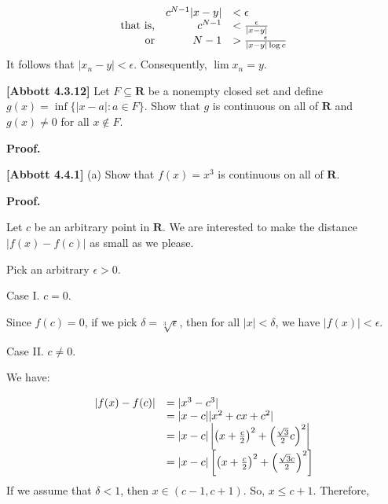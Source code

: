 \documentclass[10pt]{article}
\begin{document}
\begin{equation*}
\begin{array}{ r r l }
 & c^{N-1} |x-y| & < \epsilon \\
\text{that is,} & c^{N-1} & < \frac{\epsilon }{|x-y|}\\
\text{or} & N-1 &  >\frac{\epsilon }{|x-y|\log c}
\end{array}
\end{equation*}
It follows that $\displaystyle |x_{n} -y|< \epsilon $. Consequently, $\displaystyle \lim x_{n} =y$.



\textbf{[Abbott 4.3.12]} Let $\displaystyle F\subseteq \mathbf{R}$ be a nonempty closed set and define $\displaystyle g( x) =\inf\{|x-a|:a\in F\}$. Show that $\displaystyle g$ is continuous on all of $\displaystyle \mathbf{R}$ and $\displaystyle g( x) \neq 0$ for all $\displaystyle x\notin F$.



\textbf{Proof.}



\textbf{[Abbott 4.4.1]} (a) Show that $\displaystyle f( x) =x^{3}$ is continuous on all of $\displaystyle \mathbf{R}$.



\textbf{Proof.}



Let $\displaystyle c$ be an arbitrary point in $\displaystyle \mathbf{R}$. We are interested to make the distance $\displaystyle |f( x) -f( c) |$ as small as we please.



Pick an arbitrary $\displaystyle \epsilon  >0$. 



Case I. $\displaystyle c=0$.



Since $\displaystyle f( c) =0$, if we pick $\displaystyle \delta =\sqrt[3] \epsilon $, then for all $\displaystyle |x|< \delta $, we have $\displaystyle |f( x) |< \epsilon $.



Case II. $\displaystyle c\neq 0$.



We have:


\begin{equation*}
\begin{array}{ c l }
|f( x) -f( c) | & =|x^{3} -c^{3} |\\
 & =|x-c||x^{2} +cx+c^{2} |\\
 & =|x-c|\left| \left( x+\frac{c}{2}\right)^{2} +\left(\frac{\sqrt{3}}{2} c\right)^{2}\right| \\
 & =|x-c|\left[\left( x+\frac{c}{2}\right)^{2} +\left(\frac{\sqrt{3} c}{2}\right)^{2}\right]
\end{array}
\end{equation*}
If we assume that $\displaystyle \delta < 1$, then $\displaystyle x\in ( c-1,c+1)$. So, $\displaystyle x\leq c+1$. Therefore,
\end{document}

